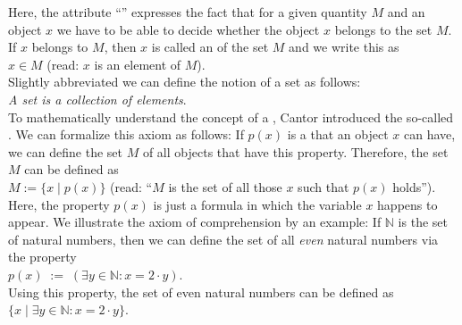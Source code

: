 \noindent
Here, the attribute ``'' expresses the fact that for a given quantity $M$ and an object $x$ we have
to be able to decide whether the object $x$ belongs to the set $M$.  If $x$ belongs to $M$, then $x$ is called an
 of the set $M$ and we write this as
\\[0.2cm]
\hspace*{1.3cm}
$x \in M$ \quad (read: $x$ is an element of $M$). 
\\[0.2cm]
Slightly abbreviated we can define the notion of a set as follows: 
\\[0.2cm]
\hspace*{1.3cm}
\textsl{A set is a  collection of elements}.
\\[0.2cm]
To mathematically understand the concept of a ,
Cantor introduced the so-called  .
We can formalize this axiom as follows:  If $p(x)$ is a  that
an object $x$ can have, we can define the set $M$ of all objects that have this
property.  Therefore, the set $M$ can be defined as 
\\[0.2cm]
\hspace*{1.3cm} 
$M := \{ x \;|\; p(x) \}$ \quad (read: ``$M$ is the set of all those $x$ such that $p(x)$ holds'').
\\[0.2cm]
Here, the property $p(x)$ is just a formula in which the variable $x$ happens to appear.
We illustrate the axiom of comprehension by an example: If $\mathbb{N}$ is
the set of natural numbers, then we can define the set of all \emph{even} natural numbers
via the property \\[0.2cm]
\hspace*{1.3cm} $p(x) \;:=\; (\exists y\in \mathbb{N}: x = 2 \cdot y)$. \\[0.2cm]
Using this property, the set of even natural numbers can be defined as \\[0.2cm]
\hspace*{1.3cm} $\{ x \;|\; \exists y\in \mathbb{N}: x = 2 \cdot y \}$. 

